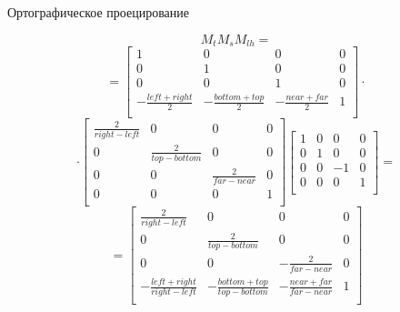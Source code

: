 \documentclass{beamer}
\begin{document}
	\begin{frame}{Ортографическое проецирование}

		\[
			M_t M_s M_{lh} =
		\]
		\vspace{-0.5cm}
		\[
			=
			\begin{bmatrix}
				1 & 0 & 0 & 0 \\
				0 & 1 & 0 & 0 \\
				0 & 0 & 1 & 0 \\
				-\frac{left + right}{2} & -\frac{bottom + top}{2} &  -\frac{near + far}{2} & 1 \\
			\end{bmatrix}	
			\cdot
			\]
			\vspace{-0.2cm}
			\[
			\cdot
			\begin{bmatrix}
				\frac{2}{right - left} & 0 & 0 & 0 \\
				0 & \frac{2}{top - bottom} & 0 & 0 \\
				0 & 0 & \frac{2}{far - near} & 0 \\
				0 & 0 & 0 & 1 \\
			\end{bmatrix}	
			\begin{bmatrix}
				1 & 0 & 0 & 0 \\
				0 & 1 & 0 & 0 \\
				0 & 0 & -1 & 0 \\
				0 & 0 & 0 & 1 \\
			\end{bmatrix}	
			=
		\]
		\vspace{-0.2cm}
		\[
			=
			\begin{bmatrix}
				\frac{2}{right - left} & 0 & 0 & 0 \\
				0 & \frac{2}{top - bottom} & 0 & 0 \\
				0 & 0 & -\frac{2}{far - near} & 0 \\
				-\frac{left + right}{right - left} & -\frac{bottom + top}{top - bottom} &  -\frac{near + far}{far - near} & 1 \\
			\end{bmatrix}		
		\]
	



\end{frame}
\end{document}
